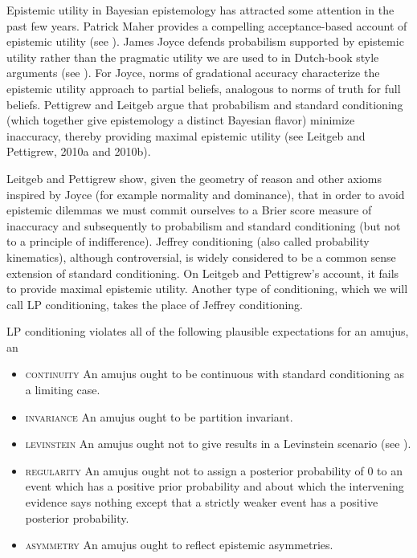 \documentclass[11pt]{article} \usepackage{october}
\begin{document}
Epistemic utility in Bayesian epistemology has attracted some
attention in the past few years. Patrick Maher provides a compelling
acceptance-based account of epistemic utility (see
). James Joyce defends probabilism
supported by epistemic utility rather than the pragmatic utility we
are used to in Dutch-book style arguments (see ).
For Joyce, norms of gradational accuracy characterize the epistemic
utility approach to partial beliefs, analogous to norms of truth for
full beliefs. Pettigrew and Leitgeb argue that probabilism and
standard conditioning (which together give epistemology a distinct
Bayesian flavor) minimize inaccuracy, thereby providing maximal
epistemic utility (see Leitgeb and Pettigrew,
2010a and
2010b).

Leitgeb and Pettigrew show, given the geometry of reason and other
axioms inspired by Joyce (for example normality and dominance), that
in order to avoid epistemic dilemmas we must commit ourselves to a
Brier score measure of inaccuracy and subsequently to probabilism and
standard conditioning (but not to a principle of indifference).
Jeffrey conditioning (also called probability kinematics), although
controversial, is widely considered to be a common sense extension of
standard conditioning. On Leitgeb and Pettigrew's account, it fails to
provide maximal epistemic utility. Another type of conditioning, which
we will call LP conditioning, takes the place of Jeffrey conditioning.

LP conditioning violates all of the following plausible expectations
for an amujus, an 

\begin{itemize}
\item \textsc{continuity} An amujus ought to be continuous with
  standard conditioning as a limiting case.
\item \textsc{invariance} An amujus ought to be partition invariant.
\item \textsc{levinstein} An amujus ought not to give  results in a Levinstein scenario (see
  ).
\item \textsc{regularity} An amujus ought not to assign a posterior
  probability of $0$ to an event which has a positive prior
  probability and about which the intervening evidence says nothing
  except that a strictly weaker event has a positive posterior
  probability.
\item \textsc{asymmetry} An amujus ought to reflect epistemic
  asymmetries.
\end{itemize}
\end{document}
